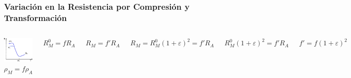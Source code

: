 \documentclass[usenames,dvipsnames]{beamer}
\begin{document}
\begin{frame}
 \frametitle{Variación en la Resistencia por Compresión y Transformación}

\begin{columns}
\includegraphics[width=\textwidth]{img/resistencia/Resistencia.eps}
$ \rho_M =f \rho_A$

$R_M^0 =fR_A$
\vspace{0.5cm}

$ {R_M}=f'R_A $

\vspace{0.5cm}

$R_M=R_M^0 (1+\varepsilon)^2 = f' R_A$

\vspace{0.5cm}

$ R_M^0 (1+\varepsilon)^2 = f'R_A$  
\vspace{0.5cm}
\begin{center}
\begin{block}{\quad $f' = f (1+\varepsilon)^2$}
\end{block}
\end{center}
\end{columns}
\end{frame}
 
 
 
\end{document}
